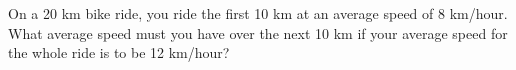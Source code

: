 On a 20 km bike ride, you ride the first 10 km at an average
speed of 8 km/hour. What  average speed must you have over the next 10 km
if your average speed for the whole ride is to be 12 km/hour?\answercheck
